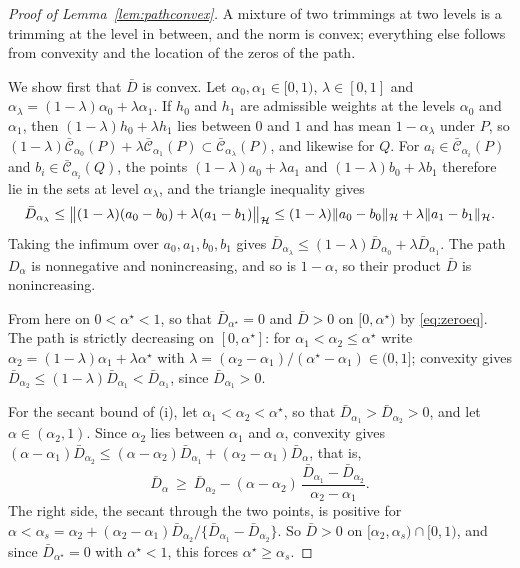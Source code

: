 \begin{proof}[Proof of Lemma~\ref{lem:pathconvex}]
A mixture of two trimmings at two levels is a trimming at the level in between, and the norm is convex; everything
else follows from convexity and the location of the zeros of the path.

We show first that $\bar D$ is convex. Let $\alpha_0,\alpha_1\in[0,1)$, $\lambda\in[0,1]$ and $\alpha_\lambda=(1-\lambda)\alpha_0+\lambda\alpha_1$.
If $h_0$ and $h_1$ are admissible weights at the levels $\alpha_0$ and $\alpha_1$, then $(1-\lambda)h_0+\lambda h_1$
lies between $0$ and $1$ and has mean $1-\alpha_\lambda$ under $P$, so
$(1-\lambda)\bar{\mathcal C}_{\alpha_0}(P)+\lambda \bar{\mathcal C}_{\alpha_1}(P)\subset \bar{\mathcal C}_{\alpha_\lambda}(P)$, and likewise for $Q$. For
$a_i\in \bar{\mathcal C}_{\alpha_i}(P)$ and $b_i\in \bar{\mathcal C}_{\alpha_i}(Q)$, the points $(1-\lambda)a_0+\lambda a_1$ and
$(1-\lambda)b_0+\lambda b_1$ therefore lie in the sets at level $\alpha_\lambda$, and the triangle inequality gives
\[
\bar D_{\alpha_\lambda}\le\big\|(1-\lambda)(a_0-b_0)+\lambda(a_1-b_1)\big\|_{\mathcal{H}}\le(1-\lambda)\|a_0-b_0\|_{\mathcal{H}}+\lambda\|a_1-b_1\|_{\mathcal{H}} .
\]
Taking the infimum over $a_0,a_1,b_0,b_1$ gives $\bar D_{\alpha_\lambda}\le(1-\lambda)\bar D_{\alpha_0}+\lambda \bar D_{\alpha_1}$. The path
$D_\alpha$ is nonnegative and nonincreasing, and so is $1-\alpha$, so their product $\bar D$ is nonincreasing.

From here on $0<\alpha^\star<1$, so that $\bar D_{\alpha^\star}=0$ and $\bar D>0$ on $[0,\alpha^\star)$ by
\eqref{eq:zeroeq}. The path is strictly
decreasing on $[0,\alpha^\star]$: for $\alpha_1<\alpha_2\le\alpha^\star$ write
$\alpha_2=(1-\lambda)\alpha_1+\lambda\alpha^\star$ with $\lambda=(\alpha_2-\alpha_1)/(\alpha^\star-\alpha_1)\in(0,1]$;
convexity gives $\bar D_{\alpha_2}\le(1-\lambda)\bar D_{\alpha_1}<\bar D_{\alpha_1}$, since $\bar D_{\alpha_1}>0$.

For the secant bound of (i), let $\alpha_1<\alpha_2<\alpha^\star$, so that $\bar D_{\alpha_1}>\bar D_{\alpha_2}>0$, and let
$\alpha\in(\alpha_2,1)$. Since $\alpha_2$ lies between $\alpha_1$ and $\alpha$, convexity gives
$(\alpha-\alpha_1)\bar D_{\alpha_2}\le(\alpha-\alpha_2)\bar D_{\alpha_1}+(\alpha_2-\alpha_1)\bar D_{\alpha}$, that is,
\[
\bar D_{\alpha}\ \ge\ \bar D_{\alpha_2}-(\alpha-\alpha_2)\,\frac{\bar D_{\alpha_1}-\bar D_{\alpha_2}}{\alpha_2-\alpha_1} .
\]
The right side, the secant through the two points, is positive for $\alpha<\alpha_s=\alpha_2+(\alpha_2-\alpha_1)\bar D_{\alpha_2}
/\{\bar D_{\alpha_1}-\bar D_{\alpha_2}\}$. So $\bar D>0$ on $[\alpha_2,\alpha_s)\cap[0,1)$, and since $\bar D_{\alpha^\star}=0$ with
$\alpha^\star<1$, this forces $\alpha^\star\ge\alpha_s$.


\end{proof}

